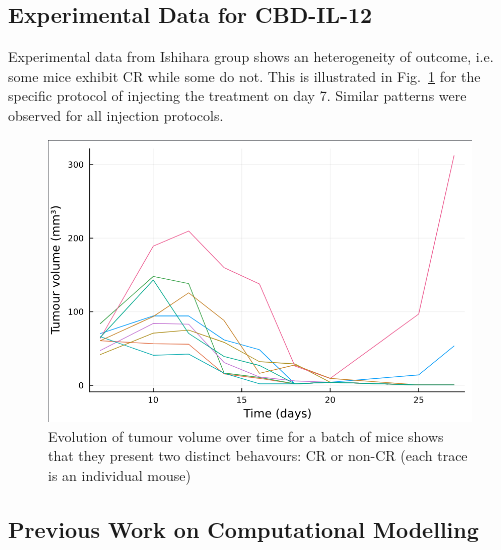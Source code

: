 \documentclass[11pt]{article}
\begin{document}
\subsection{Experimental Data for CBD-IL-12}
Experimental data from Ishihara group \cite{cbdil12} shows an heterogeneity of outcome, i.e. some mice exhibit CR while some do not. This is illustrated in Fig.~\ref{fig:outcomedual} for the specific protocol of injecting the treatment on day 7. Similar patterns were observed for all injection protocols.
\begin{figure}[!ht]
    \centering\includegraphics[scale=0.4]{crnoncr2.png}
    \caption{Evolution of tumour volume over time for a batch of mice shows that they present two distinct behavours: CR or non-CR (each trace is an individual mouse)}
    \label{fig:outcomedual}
\end{figure}
\subsection{Previous Work on Computational Modelling}\label{ssec:prevWork}
\end{document}

